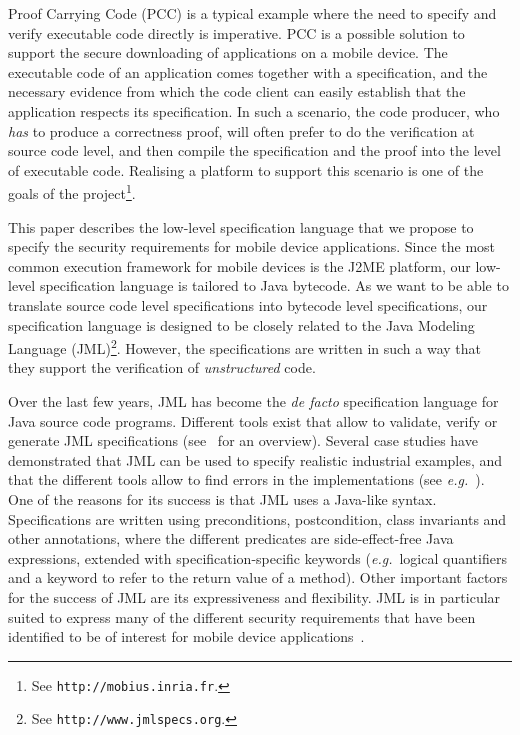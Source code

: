 Proof Carrying Code (PCC) is a typical example where the need to
specify and verify executable code directly is imperative. PCC is a
possible solution to support the secure downloading of applications on
a mobile device. The executable code of an application comes together
with a specification, and the necessary evidence from which the code
client can easily establish that the application respects its
specification. In such a scenario, the code producer, who \emph{has}
to produce a correctness proof, will often prefer to do the
verification at source code level, and then compile the specification
and the proof into the level of executable code. Realising a platform
to support this scenario is one of the goals of the \mobius
project\footnote{See
\texttt{http://mobius.inria.fr}.}. 

This paper describes the low-level specification language that we
propose to specify the security requirements for mobile device
applications. Since the most common execution framework for mobile
devices is the J2ME platform, our low-level specification language is
tailored to Java bytecode. As we want to be able to translate
source code level specifications into bytecode level specifications,
our specification language is designed to be closely related
to the Java Modeling Language (JML)\footnote{See
\texttt{http://www.jmlspecs.org}.}. However, the specifications are
written in such a way that they support the verification of
\emph{unstructured} code. 


Over the last few years, JML has become the \emph{de facto}
specification language for Java source code programs. Different tools
exist that allow to validate, verify or generate JML specifications
(see~\cite{BurdyCCEKLLP05} for an overview). Several case studies have
demonstrated that JML can be used to specify realistic industrial
examples, and that the different tools allow to find errors in the
implementations (see \emph{e.g.}~\cite{BreunesseCHJ04}). One of the reasons
for its success is that JML uses a Java-like syntax. Specifications
are written using preconditions, postcondition, class invariants and
other annotations, where the different predicates are side-effect-free
Java expressions, extended with specification-specific keywords
(\emph{e.g.}\ logical quantifiers and a keyword to refer to the return value
of a method). Other important factors for the success of JML are its
expressiveness and flexibility. JML is in particular suited to express
many of the different security requirements that have been identified
to be of interest for mobile device
applications~\cite{Deliverable1.2}.


